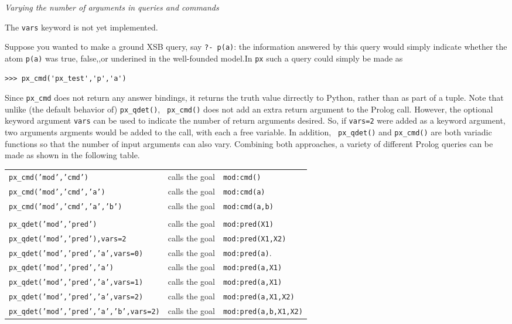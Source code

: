\begin{example} \rm {\it Varying the number of arguments in queries and commands}

  {\sc The {\tt vars} keyword is not yet implemented.}

  Suppose you wanted to make a ground XSB query, say {\tt ?- p(a)}:
  the information answered by this query would simply indicate whether
  the atom {\tt p(a)} was true, false,,or underined in the
  well-founded model.In {\tt px} such a query could simply be made
  as

\begin{verbatim}  
>>> px_cmd('px_test','p','a')  
\end{verbatim}  

Since {\tt px\_cmd} does not return any answer bindings, it returns
the truth value dirrectly to Python, rather than as part of a tuple.
Note that unlike (the default behavior of) {\tt px\_qdet()}, {\tt
  px\_cmd()} does not add an extra return argument to the Prolog call.
However, the optional keyword argument {\tt vars} can be used to
indicate the number of return arguments desired.  So, if {\tt vars=2}
were added as a keyword argument, two arguments argments would be
added to the call, with each a free variable.  In addition, {\tt
  px\_qdet()} and {\tt px\_cmd()} are both variadic functions so that
the number of input arguments can also vary.  Combining both
approaches, a variety of different Prolog queries can be made as shown
in the following table.

\begin{tabular}{lll}
  {\tt px\_cmd('mod','cmd')}                & calls the goal & {\tt mod:cmd()}\\
  {\tt px\_cmd('mod','cmd','a')}            & calls the goal & {\tt mod:cmd(a)}\\
  {\tt px\_cmd('mod','cmd','a','b')}        & calls the goal & {\tt mod:cmd(a,b)}\\
   \\ 
  {\tt px\_qdet('mod','pred')}              & calls the goal & {\tt mod:pred(X1)} \\
  {\tt px\_qdet('mod','pred'),vars=2}       & calls the goal & {\tt mod:pred(X1,X2)} \\
  {\tt px\_qdet('mod','pred','a',vars=0)}   & calls the goal & {\tt mod:pred(a)}. \\
  {\tt px\_qdet('mod','pred','a')}          & calls the goal & {\tt mod:pred(a,X1)} \\
  {\tt px\_qdet('mod','pred','a',vars=1)}   & calls the goal & {\tt mod:pred(a,X1)} \\
  {\tt px\_qdet('mod','pred','a',vars=2)}   & calls the goal & {\tt mod:pred(a,X1,X2)} \\
  {\tt px\_qdet('mod','pred','a','b',vars=2)} & calls the goal & {\tt mod:pred(a,b,X1,X2)} \\
\end{tabular}


\end{example}
